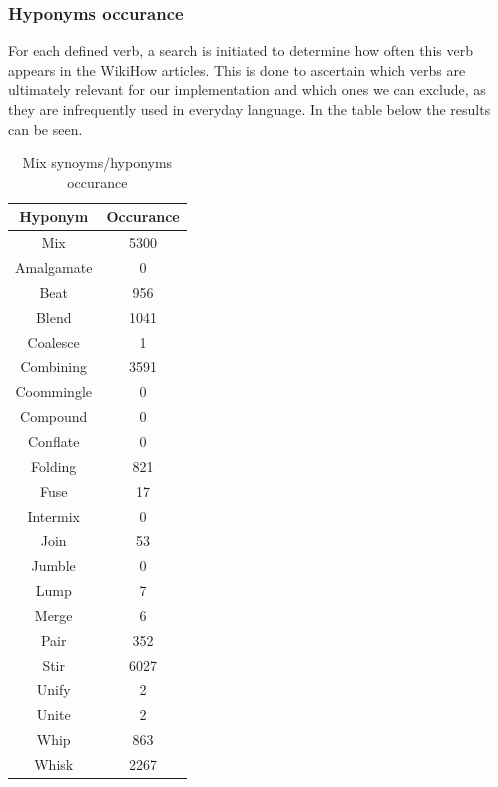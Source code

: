     \subsubsection*{Hyponyms occurance}
    For each defined verb, a search is initiated to determine how often this verb appears in the WikiHow articles. This is done to ascertain which verbs are ultimately relevant for our implementation and which ones we can exclude, as they are infrequently used in everyday language.
    In the table below the results can be seen.
    \begin{table}[H]
        \centering
        \begin{tabular}{|c|c|}
          \hline
          \textbf{Hyponym} & \textbf{Occurance}  \\
          \hline
          Mix & 5300 \\
          \hline
          Amalgamate & 0 \\
          \hline
          Beat & 956 \\
          \hline
          Blend & 1041 \\
          \hline
          Coalesce & 1 \\
          \hline
          Combining & 3591  \\
          \hline
          Coommingle & 0 \\
          \hline
          Compound & 0 \\
          \hline
          Conflate & 0 \\
          \hline
          Folding & 821 \\
          \hline
          Fuse & 17 \\
          \hline
          Intermix & 0 \\
          \hline
          Join & 53 \\
          \hline
          Jumble & 0 \\
          \hline
          Lump & 7 \\
          \hline
          Merge & 6 \\
          \hline
          Pair & 352 \\
          \hline
          Stir & 6027 \\
          \hline
          Unify & 2 \\
          \hline
          Unite & 2 \\
          \hline
          Whip & 863 \\
          \hline
          Whisk & 2267 \\
          \hline
          
    
        \end{tabular}
        \caption{Mix synoyms/hyponyms occurance}
        \label{tab:example}
      \end{table}
      
